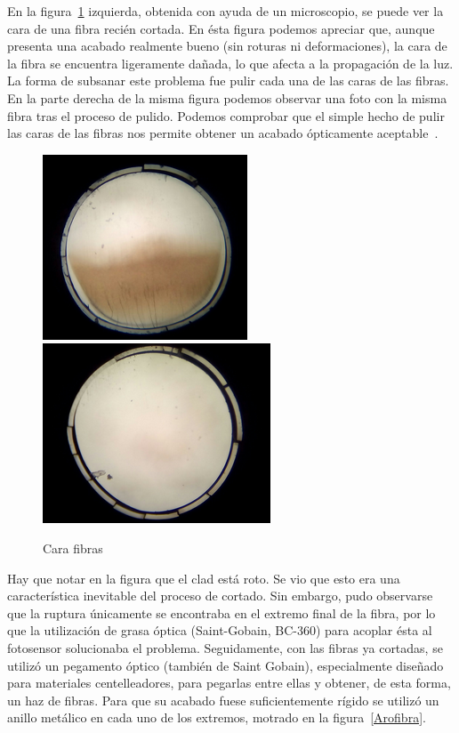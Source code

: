 En la figura~\ref{Pulido} izquierda, obtenida  con ayuda de un microscopio, se puede ver  la cara de una fibra recién cortada. En ésta  figura podemos apreciar que, aunque presenta una acabado realmente bueno (sin roturas ni deformaciones), la cara de la fibra se encuentra ligeramente dañada,  lo que afecta a la propagación de la luz. La forma de subsanar este problema fue pulir cada una de las caras de las fibras. En la parte derecha de la misma figura podemos observar una foto con la misma fibra tras el proceso de pulido. Podemos comprobar que el simple hecho de pulir las caras de las fibras nos permite obtener un acabado ópticamente aceptable~\cite{Alberto, manual}.

\begin{figure}[htb]
\centering
{
\includegraphics[scale=0.6]{SinPulir.png} 
}
{
\includegraphics[scale=0.6]{Pulida.png} 
}
\caption{Cara fibras\label{Pulido}}
\end{figure} 

Hay que notar en la figura que el clad está roto. Se vio que esto era una característica inevitable del proceso de cortado. Sin embargo, pudo observarse que la ruptura únicamente se encontraba en el extremo final de la fibra, por lo que  la utilización de grasa óptica  (Saint-Gobain, BC-360) para acoplar ésta al fotosensor solucionaba el problema. 
Seguidamente, con las fibras ya cortadas, se utilizó un pegamento óptico (también de  Saint Gobain), especialmente diseñado para materiales centelleadores, para pegarlas entre ellas y obtener, de esta forma, un haz de fibras. Para que su acabado fuese suficientemente rígido se utilizó un anillo metálico en cada uno de los extremos, motrado en la figura~\ref{Arofibra}.

